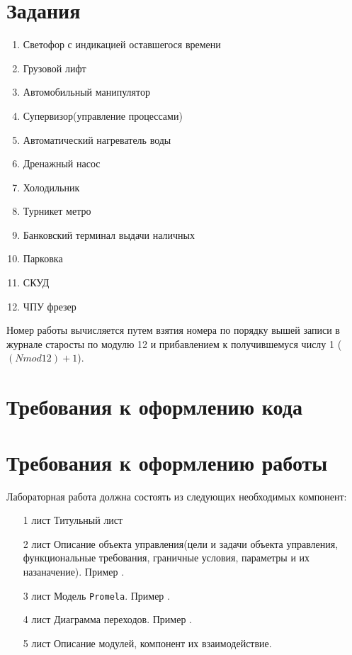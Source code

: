 \documentclass[12pt, twoside]{report}
\begin{document}
\section*{Задания}\label{lab_work_formatting}

\begin{enumerate}
  \item Светофор с индикацией оставшегося времени
  \item Грузовой лифт
  \item Автомобильный манипулятор
  \item Супервизор(управление процессами)
  \item Автоматический нагреватель воды
  \item Дренажный насос
  \item Холодильник
  \item Турникет метро
  \item Банковский терминал выдачи наличных
  \item Парковка
  \item СКУД
  \item ЧПУ фрезер
\end{enumerate}

Номер работы вычисляется путем взятия номера по порядку вышей записи в журнале старосты по модулю 12 
и прибавлением к получившемуся числу 1 ($(N mod 12) + 1$).

\section*{Требования к оформлению кода}\label{lab_work_formatting}


\section*{Требования к оформлению работы}\label{lab_work_}

Лабораторная работа должна состоять из следующих необходимых компонент:
\begin{itemize}
  \item[ 1 лист ] Титульный лист
  \item[ 2 лист ] Описание объекта управления(цели и задачи объекта управления, функциональные требования, граничные условия, параметры и их назаначение). Пример .
  \item[ 3 лист ] Модель \texttt{Promela}. Пример .
  \item[ 4 лист ] Диаграмма переходов. Пример .
  \item[ 5 лист ] Описание модулей, компонент их взаимодействие.
\end{itemize}
\end{document}
